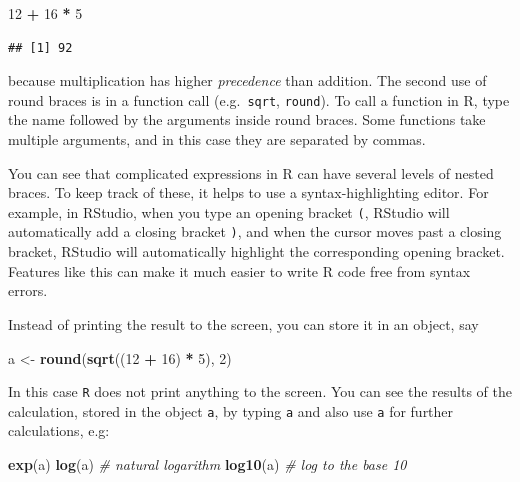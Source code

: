 \documentclass[
]{book}
\newenvironment{Shaded}{\begin{snugshade}}{\end{snugshade}}
\newcommand{\CommentTok}[1]{\textcolor[rgb]{0.56,0.35,0.01}{\textit{#1}}}
\newcommand{\DecValTok}[1]{\textcolor[rgb]{0.00,0.00,0.81}{#1}}
\newcommand{\FunctionTok}[1]{\textcolor[rgb]{0.13,0.29,0.53}{\textbf{#1}}}
\newcommand{\NormalTok}[1]{#1}
\newcommand{\OtherTok}[1]{\textcolor[rgb]{0.56,0.35,0.01}{#1}}
\newcommand{\SpecialCharTok}[1]{\textcolor[rgb]{0.81,0.36,0.00}{\textbf{#1}}}
\begin{document}
\begin{Shaded}
\begin{Highlighting}[]
\DecValTok{12} \SpecialCharTok{+} \DecValTok{16} \SpecialCharTok{*} \DecValTok{5}
\end{Highlighting}
\end{Shaded}

\begin{verbatim}
## [1] 92
\end{verbatim}

because multiplication has higher \emph{precedence} than addition. The
second use of round braces is in a function call (e.g.~\texttt{sqrt},
\texttt{round}). To call a function in R, type the name followed by the
arguments inside round braces. Some functions take multiple arguments,
and in this case they are separated by commas.

You can see that complicated expressions in R can have several levels
of nested braces. To keep track of these, it helps to use a
syntax-highlighting editor. For example, in RStudio, when you type an
opening bracket \texttt{(}, RStudio will automatically add a closing
bracket \texttt{)}, and when the cursor moves past a closing bracket,
RStudio will automatically highlight the corresponding opening
bracket. Features like this can make it much easier to write R code
free from syntax errors.

Instead of printing the result to the screen, you can store it in an object, say

\begin{Shaded}
\begin{Highlighting}[]
\NormalTok{a }\OtherTok{\textless{}{-}} \FunctionTok{round}\NormalTok{(}\FunctionTok{sqrt}\NormalTok{((}\DecValTok{12} \SpecialCharTok{+} \DecValTok{16}\NormalTok{) }\SpecialCharTok{*} \DecValTok{5}\NormalTok{), }\DecValTok{2}\NormalTok{)}
\end{Highlighting}
\end{Shaded}

In this case \texttt{R} does not print anything to the screen. You can
see the results of the calculation, stored in the object \texttt{a},
by typing \texttt{a} and also use \texttt{a} for further calculations,
e.g:

\begin{Shaded}
\begin{Highlighting}[]
\FunctionTok{exp}\NormalTok{(a)}
\FunctionTok{log}\NormalTok{(a) }\CommentTok{\# natural logarithm}
\FunctionTok{log10}\NormalTok{(a) }\CommentTok{\# log to the base 10}
\end{Highlighting}
\end{Shaded}
\end{document}
